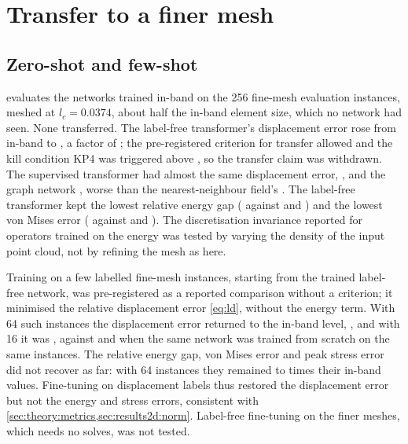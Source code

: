 \section{Transfer to a finer mesh}\label{sec:transfer}

\subsection{Zero-shot and few-shot}\label{sec:transfer:zeroshot}



 evaluates the networks trained in-band on the 256 fine-mesh evaluation
instances, meshed at $l_c=0.0374$, about half the in-band element size, which no network
had seen. None transferred. The label-free transformer's displacement error rose from
\numAmpInDisp{} in-band to \numFineFreeDisp{}, a factor of \numFineRatio{}; the
pre-registered criterion for transfer allowed \numFineWin{} and the kill condition KP4 was
triggered above \numFineKill{}, so the transfer claim was withdrawn. The supervised
transformer had almost the same displacement error, \numFineLabDisp{}, and the graph network
\numFineMgnDisp{}, worse than the nearest-neighbour field's \numFineKnnDisp{}. The
label-free transformer kept the lowest relative energy gap (\numFineFreeGap{} against
\numFineLabGap{} and \numFineMgnGap{}) and the lowest von Mises error (\numFineFreeVm{}
against \numFineLabVm{} and \numFineMgnVm{}). The discretisation invariance reported for
operators trained on the energy \cite{Wang2026PretrainFEM,Sun2026FEVessel} was tested by
varying the density of the input point cloud, not by refining the mesh as here.

Training on a few labelled fine-mesh instances, starting from the trained label-free
network, was pre-registered as a reported comparison without a criterion; it minimised the
relative displacement error \eqref{eq:ld}, without the energy term. With 64 such instances
the displacement error returned to the in-band level, \numFewSixtyFourDisp{}, and with 16 it
was \numFewSixteenDisp{}, against \numFewSixtyFourScratchDisp{} and
\numFewSixteenScratchDisp{} when the same network was trained from scratch on the same
instances. The relative energy gap, von Mises error and peak stress error did not recover
as far: with 64 instances they remained \numFewFactorMin{} to \numFewFactorMax{} times their
in-band values. Fine-tuning on displacement labels thus restored the displacement error but
not the energy and stress errors, consistent with
\cref{sec:theory:metrics,sec:results2d:norm}.
Label-free fine-tuning on the finer meshes, which needs no solves, was not tested.

